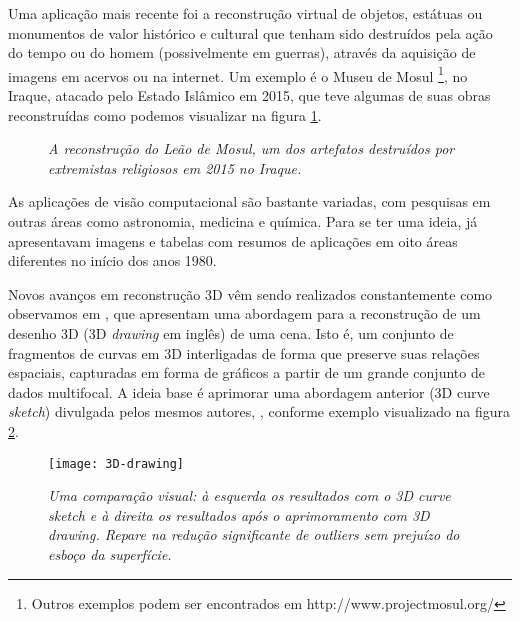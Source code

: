 Uma aplicação mais recente foi a reconstrução virtual de objetos, estátuas ou monumentos de valor histórico e cultural que tenham sido destruídos pela ação do tempo ou do homem (possivelmente em guerras), através da aquisição de imagens em acervos ou na internet. Um exemplo é o Museu de Mosul {\footnote{Outros exemplos podem ser encontrados em http://www.projectmosul.org/}}, no Iraque, atacado pelo 
Estado Islâmico em 2015, que teve algumas de suas obras reconstruídas como podemos visualizar na figura \ref{fig.mossul}.

\begin{figure}[!htb]
\centering
{}
\quad
{}
\caption{{\it A reconstrução do Leão de Mosul, um dos artefatos destruídos por extremistas religiosos em 2015 no Iraque.}}
\label{fig.mossul}
\end{figure}

As aplicações de visão computacional são bastante variadas, com pesquisas em outras áreas como astronomia, medicina e química. Para se ter uma ideia, \citep{ballard-82} já apresentavam imagens e tabelas com resumos de aplicações em oito áreas diferentes no início dos anos 1980.  

Novos avanços em reconstrução 3D vêm sendo realizados constantemente como observamos em \citep{fabbri-drawing}, que apresentam uma abordagem para a reconstrução de um desenho 3D (3D \emph{drawing} em inglês) de uma cena. Isto é, um conjunto de fragmentos de curvas em 3D interligadas de forma que preserve suas relações espaciais, capturadas em forma de gráficos a partir de um grande conjunto de dados multifocal. A ideia base é aprimorar uma abordagem anterior (3D curve \emph{sketch}) divulgada pelos mesmos autores, \citep{fabbri-sketch}, conforme exemplo visualizado na figura \ref{fig.drawing}.
\begin{figure}[!htb]
\centering
\texttt{[image: 3D-drawing]}
\caption{{\it Uma comparação visual: à esquerda os resultados com o 3D curve sketch e à direita os resultados após o aprimoramento com 3D drawing. Repare na redução significante de outliers sem prejuízo do esboço da superfície.}}
\label{fig.drawing}
\end{figure}


